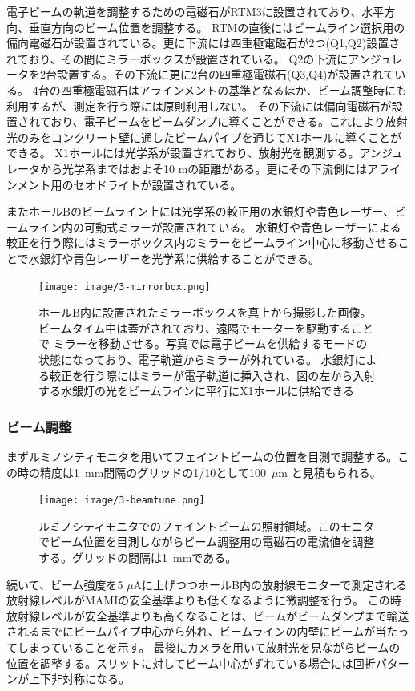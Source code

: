 \documentclass[a4paper,11pt,uplatex]{jsbook}
\begin{document}
電子ビームの軌道を調整するための電磁石がRTM3に設置されており、水平方向、垂直方向のビーム位置を調整する。
RTMの直後にはビームライン選択用の偏向電磁石が設置されている。更に下流には四重極電磁石が2つ(Q1,Q2)設置されており、その間にミラーボックスが設置されている。
Q2の下流にアンジュレータを2台設置する。その下流に更に2台の四重極電磁石(Q3,Q4)が設置されている。
4台の四重極電磁石はアラインメントの基準となるほか、ビーム調整時にも利用するが、測定を行う際には原則利用しない。
その下流には偏向電磁石が設置されており、電子ビームをビームダンプに導くことができる。これにより放射光のみをコンクリート壁に通したビームパイプを通じてX1ホールに導くことができる。
X1ホールには光学系が設置されており、放射光を観測する。アンジュレータから光学系まではおよそ10 mの距離がある。更にその下流側にはアラインメント用のセオドライトが設置されている。

またホールBのビームライン上には光学系の較正用の水銀灯や青色レーザー、ビームライン内の可動式ミラーが設置されている。
水銀灯や青色レーザーによる較正を行う際にはミラーボックス内のミラーをビームライン中心に移動させることで水銀灯や青色レーザーを光学系に供給することができる。
\begin{figure}[H]
  \centering
  \texttt{[image: image/3-mirrorbox.png]}\\
  \caption[ミラーボックスの写真]{ホールB内に設置されたミラーボックスを真上から撮影した画像。ビームタイム中は蓋がされており、遠隔でモーターを駆動することで
  ミラーを移動させる。写真では電子ビームを供給するモードの状態になっており、電子軌道からミラーが外れている。
  水銀灯による較正を行う際にはミラーが電子軌道に挿入され、図の左から入射する水銀灯の光をビームラインに平行にX1ホールに供給できる}
  \label{mirrorbox}
\end{figure}
\subsubsection{ビーム調整}
まずルミノシティモニタを用いてフェイントビームの位置を目測で調整する。この時の精度は1~mm間隔のグリッドの1/10として100~$\mu$m と見積もられる。
\begin{figure}[H]
  \centering
  \texttt{[image: image/3-beamtune.png]}\\
  \caption[ルミノシティモニタ]{ルミノシティモニタでのフェイントビームの照射領域。このモニタでビーム位置を目測しながらビーム調整用の電磁石の電流値を調整する。グリッドの間隔は1~mmである。}
  \label{luminosity}
\end{figure}

続いて、ビーム強度を5 $\si{\mu}\text{A}$に上げつつホールB内の放射線モニターで測定される放射線レベルがMAMIの安全基準よりも低くなるように微調整を行う。
この時放射線レベルが安全基準よりも高くなることは、ビームがビームダンプまで輸送されるまでにビームパイプ中心から外れ、ビームラインの内壁にビームが当たってしまっていることを示す。
最後にカメラを用いて放射光を見ながらビームの位置を調整する。スリットに対してビーム中心がずれている場合には回折パターンが上下非対称になる。
\end{document}
